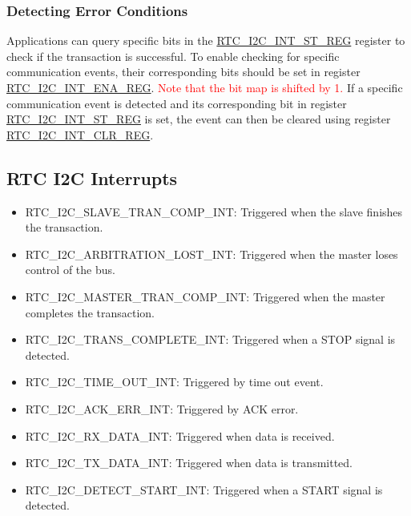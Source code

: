 \documentclass[main\_\_EN.tex]{subfiles}
\begin{document}
\subsubsection{Detecting Error Conditions} \label{paragraph:ULP-detecting-errors}
Applications can query specific bits in the \hyperref[regdesc:RTCI2CINTSTREG]{RTC\_I2C\_INT\_ST\_REG} register to check if the transaction is successful. To enable checking for specific communication events, their corresponding bits should be set in register \hyperref[regdesc:RTCI2CINTENAREG]{RTC\_I2C\_INT\_ENA\_REG}. \textcolor{red}{Note that the bit map is shifted by 1.} If a specific communication event is detected and its corresponding bit in register  \hyperref[regdesc:RTCI2CINTSTREG]{RTC\_I2C\_INT\_ST\_REG} is set, the event can then be cleared using register \hyperref[regdesc:RTCI2CINTCLRREG]{RTC\_I2C\_INT\_CLR\_REG}.

\subsection{RTC I2C Interrupts}\label{RTC_I2C_interrupt}

\begin{itemize}

    \item \label{interrupt:RTCI2CSLAVETRANCOMPINT}RTC\_I2C\_SLAVE\_TRAN\_COMP\_INT: Triggered when the slave finishes the transaction.

    \item \label{interrupt:RTCI2CARBITRATIONLOSTINT}RTC\_I2C\_ARBITRATION\_LOST\_INT: Triggered when the master loses control of the bus.
    \item \label{interrupt:RTCI2CMASTERTRANCOMPINT}RTC\_I2C\_MASTER\_TRAN\_COMP\_INT: Triggered when the master completes the transaction.
    \item \label{interrupt:RTCI2CTRANSCOMPLETEINT}RTC\_I2C\_TRANS\_COMPLETE\_INT: Triggered when a STOP signal is detected.
    \item \label{interrupt:RTCI2CTIMEOUTINT}RTC\_I2C\_TIME\_OUT\_INT: Triggered by time out event.
    \item \label{interrupt:RTCI2CACKERRINT}RTC\_I2C\_ACK\_ERR\_INT: Triggered by ACK error.
    \item \label{interrupt:RTCI2CRXDATAINT}RTC\_I2C\_RX\_DATA\_INT: Triggered when data is received.
    \item \label{interrupt:RTCI2CTXDATAINT}RTC\_I2C\_TX\_DATA\_INT: Triggered when data is transmitted.
    \item \label{interrupt:RTCI2CDETECTSTARTINT}RTC\_I2C\_DETECT\_START\_INT: Triggered when a START signal is detected.
\end{itemize}
\end{document}
